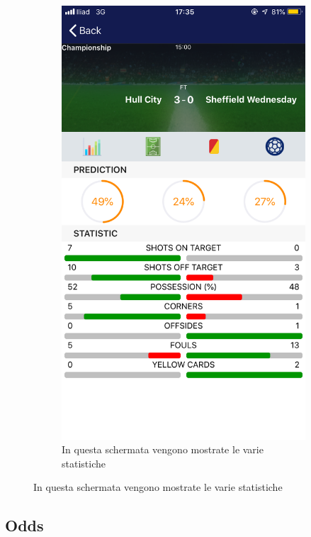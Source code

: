 \documentclass[numbers=noenddot, 12pt, a4paper, oneside]{scrbook}
\begin{document}
\begin{figure}[H]
	\centering
	\begin{subfigure}{.5\textwidth}
		\centering
		\includegraphics[width=.8\linewidth]{images/Screen/Statistica}
		\caption{In questa schermata vengono mostrate le varie statistiche}
	\end{subfigure}
\end{figure}

\subsection*{Odds}
\end{document}

